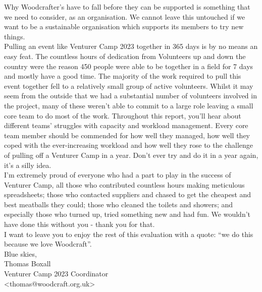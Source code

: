 Why Woodcrafter's have to fall before they can be supported is something that we need to consider, as an organisation. We cannot leave this untouched if we want to be a sustainable organisation which supports its members to try new things.\\

Pulling an event like Venturer Camp 2023 together in 365 days is by no means an easy feat. The countless hours of dedication from Volunteers up and down the country were the reason 450 people were able to be together in a field for 7 days and mostly have a good time. The majority of the work required to pull this event together fell to a relatively small group of active volunteers. Whilst it may seem from the outside that we had a substantial number of volunteers involved in the project, many of these weren't able to commit to a large role leaving a small core team to do most of the work. Throughout this report, you'll hear about different teams' struggles with capacity and workload management. Every core team member should be commended for how well they managed, how well they coped with the ever-increasing workload and how well they rose to the challenge of pulling off a Venturer Camp in a year. Don't ever try and do it in a year again, it's a silly idea.\\

I'm extremely proud of everyone who had a part to play in the success of Venturer Camp, all those who contributed countless hours making meticulous spreadsheets; those who contacted suppliers and chased to get the cheapest and best meatballs they could; those who cleaned the toilets and showers; and especially those who turned up, tried something new and had fun. We wouldn't have done this without you - thank you for that.\\

I want to leave you to enjoy the rest of this evaluation with a quote: ``we do this because we love Woodcraft''.\\

Blue skies,\\

Thomas Boxall\\

Venturer Camp 2023 Coordinator\\
<thomas@woodcraft.org.uk>
